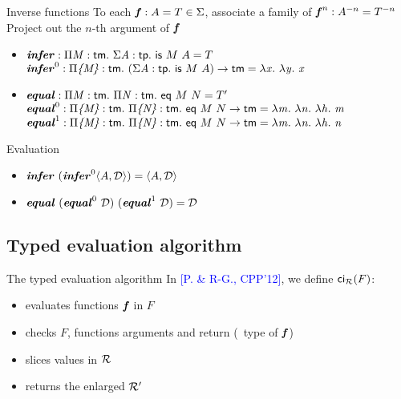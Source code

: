 \begin{frame}{Inverse functions}
  To each $\fct{f}:A=T\in\Sigma$, associate a family of $\fcti{f} n
  : A^{-n} = T^{-n}$\\
  Project out the $n$-th argument of $\fct{f}$
  \begin{examples}
    \begin{itemize}
    \item
      $\fct{infer} : \prd M {\cst{tm}} \sig A {\cst{tp}}
      {\app{\cst{is}}\app M A}  = T$ \\
      $\fcti{infer}{0} : \prd {\{M\}} {\cst{tm}}
      {(\sig A {\cst{tp}}
      {\app{\cst{is}}\app M A})} \to \cst{tm} = \lam x \lam y \var x$

    \item $\fct{equal} : \prd M {\cst{tm}} \prd N {\cst{tm}}
      \app{\cst{eq}}\app M N = T'$\\
      $\fcti{equal}{0} : \prd {\{M\}} {\cst{tm}} \prd {\{N\}}
      {\cst{tm}} \app{\cst{eq}}\app M N \to \cst{tm} = \lam m \lam n
      \lam h \var m $  \\
      $\fcti{equal}{1} : \prd {\{M\}} {\cst{tm}} \prd {\{N\}}
      {\cst{tm}} \app{\cst{eq}}\app M N \to \cst{tm} = \lam m \lam n
      \lam h \var n $  \\
    \end{itemize}
  \end{examples}
  \begin{block}{Evaluation}
    \begin{itemize}
    \item $\fct{infer}\ (\fcti{infer} 0 \pair A \md) = \pair A \md$
    \item $\fct{equal}\ (\fcti{equal} 0\ \md)\ (\fcti{equal} 1\ \md) = \md$
    \end{itemize}
  \end{block}
\end{frame}

\subsection{Typed evaluation algorithm}

\begin{frame}{The typed evaluation algorithm}
  In \textcolor{blue}{[P. \& R-G., CPP'12]}, we define $\commit \mr F$:
  \begin{itemize}
  \item evaluates functions $\fct f$ in $F$
  \item checks $F$, functions arguments and return (\wrt\ type of
    $\fct f$)
  \item slices values in $\mr$
  \item returns the enlarged $\mmr$
  \end{itemize}
\end{frame}

